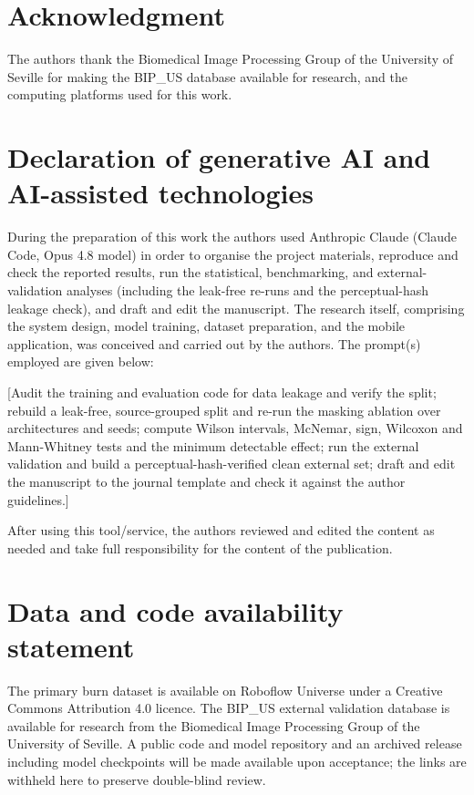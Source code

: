 \documentclass{elektr}
\begin{document}
\section*{Acknowledgment}
The authors thank the Biomedical Image Processing Group of the University of Seville for making the BIP\_US database available for research, and the computing platforms used for this work.

\section*{Declaration of generative AI and AI-assisted technologies}
During the preparation of this work the authors used Anthropic Claude (Claude Code, Opus 4.8 model) in order to organise the project materials, reproduce and check the reported results, run the statistical, benchmarking, and external-validation analyses (including the leak-free re-runs and the perceptual-hash leakage check), and draft and edit the manuscript. The research itself, comprising the system design, model training, dataset preparation, and the mobile application, was conceived and carried out by the authors. The prompt(s) employed are given below:

[Audit the training and evaluation code for data leakage and verify the split; rebuild a leak-free, source-grouped split and re-run the masking ablation over architectures and seeds; compute Wilson intervals, McNemar, sign, Wilcoxon and Mann-Whitney tests and the minimum detectable effect; run the external validation and build a perceptual-hash-verified clean external set; draft and edit the manuscript to the journal template and check it against the author guidelines.]

After using this tool/service, the authors reviewed and edited the content as needed and take full responsibility for the content of the publication.

\section*{Data and code availability statement}
The primary burn dataset is available on Roboflow Universe \cite{roboflow} under a Creative Commons Attribution 4.0 licence. The BIP\_US external validation database is available for research from the Biomedical Image Processing Group of the University of Seville. A public code and model repository and an archived release including model checkpoints will be made available upon acceptance; the links are withheld here to preserve double-blind review.
\end{document}
